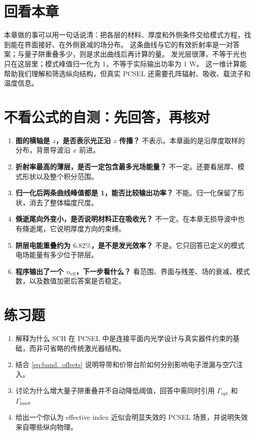 \section*{回看本章}
本章做的事可以用一句话说清：把各层的材料、厚度和外侧条件交给模式方程，找到能在界面接好、在外侧衰减的场分布。
这条曲线与它的有效折射率是一对答案；与量子阱重叠多少，则是求出曲线后再计算的量。
发光层很薄，不等于光也只在这层里；模式峰值归一化为 1，不等于实际输出功率为 1 W。
这一维计算能帮助我们理解和筛选纵向结构，但真实 PCSEL 还需要孔阵辐射、吸收、载流子和温度信息。

\section*{不看公式的自测：先回答，再核对}
\begin{enumerate}
  \item \textbf{图的横轴是 $z$，是否表示光正沿 $z$ 传播？}
  不表示。本章画的是沿厚度取样的分布，背景导波沿 $x$ 前进。
  \item \textbf{折射率最高的薄层，是否一定包含最多光场能量？}
  不一定。还要看层厚、模式形状以及整个积分范围。
  \item \textbf{归一化后两条曲线峰值都是 1，能否比较输出功率？}
  不能。归一化保留了形状，消去了整体幅度尺度。
  \item \textbf{倏逝尾向外变小，是否说明材料正在吸收光？}
  不一定。在本章无损导波中也有倏逝尾，它说明厚度方向的束缚。
  \item \textbf{阱层电能重叠约为 $6.82\%$，是不是发光效率？}
  不是。它只回答已定义的模式电场能量有多少位于阱层。
  \item \textbf{程序输出了一个 $n_{\mathrm{eff}}$，下一步看什么？}
  看范围、界面与残差、场的衰减、模式数，以及数值加密后答案是否稳定。
\end{enumerate}

\section*{练习题}
\begin{enumerate}
  \item \basicq 解释为什么 SCH 在 PCSEL 中是连接平面内光学设计与真实器件约束的基础，而非可省略的传统激光器结构。

  \item \basicq 结合 \cref{eq:band_offsets} 说明导带和价带台阶如何分别影响电子泄漏与空穴注入。

  \item \midq 讨论为什么增大量子阱重叠并不自动降低阈值，回答中需同时引用 $\Gamma_{\mathrm{opt}}$ 和 $\Gamma_{\mathrm{loss}}$。

  \item \hardq 给出一个你认为 effective index 近似会明显失效的 PCSEL 场景，并说明失效来自哪些纵向物理。
\end{enumerate}

